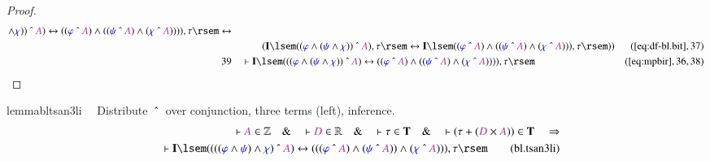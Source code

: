 \begin{proof}
\begin{align}
      \wedge \mw{\chi} ) ) ~\string^~ \mc{A} )
      \leftrightarrow ( ( \mw{\varphi} ~\string^~ \mc{A} )
      \wedge ( ( \mw{\psi} ~\string^~ \mc{A} ) \wedge (
      \mw{\chi} ~\string^~ \mc{A} ) ) ) ) , \tau \rsem
      \leftrightarrow  \notag \\ & & & \qquad
     ( \mathbf{I} \lsem ( ( \mw{\varphi}
      \wedge ( \mw{\psi} \wedge \mw{\chi} ) ) ~\string^~
      \mc{A} ) , \tau \rsem \leftrightarrow \mathbf{I}
      \lsem ( ( \mw{\varphi} ~\string^~ \mc{A} ) \wedge ( (
      \mw{\psi} ~\string^~ \mc{A} ) \wedge ( \mw{\chi}
      ~\string^~ \mc{A} ) ) ) , \tau \rsem )
      )&(\mbox{\ref{eq:df-bl.bit}},37)\notag
  \\ 39 &&  & \vdash \mathbf{I} \lsem ( ( ( \mw{\varphi} \wedge ( \mw{\psi}
      \wedge \mw{\chi} ) ) ~\string^~ \mc{A} )
      \leftrightarrow ( ( \mw{\varphi} ~\string^~ \mc{A} )
      \wedge ( ( \mw{\psi} ~\string^~ \mc{A} ) \wedge (
      \mw{\chi} ~\string^~ \mc{A} ) ) ) ) , \tau
      \rsem&(\mbox{\ref{eq:mpbir}},36,38)\notag
\end{align}
\end{proof}

\begin{restatable}{lemma}{bltsan3li}~~ Distribute $~\string^~$ over
conjunction, three terms (left), inference.
\begin{align}
\vdash \mc{A} \in \mathbb{Z}\quad\&\quad \vdash \mc{D} \in
    \mathbb{R}\quad\&\quad \vdash \tau \in \mathbf{T}\quad\&\quad \vdash ( \tau
    + ( \mc{D} \times \mc{A} ) ) \in \mathbf{T}\quad\Rightarrow \notag \\ %
     \quad \vdash
    \mathbf{I} \lsem ( ( ( ( \mw{\varphi} \wedge \mw{\psi} ) \wedge \mw{\chi} )
    ~\string^~ \mc{A} ) \leftrightarrow ( ( ( \mw{\varphi} ~\string^~ \mc{A} )
    \wedge ( \mw{\psi} ~\string^~ \mc{A} ) ) \wedge ( \mw{\chi} ~\string^~
    \mc{A} ) ) ) , \tau \rsem\label{eq:bl.tsan3li}\tag{bl.tsan3li}
\end{align}
\end{restatable}

